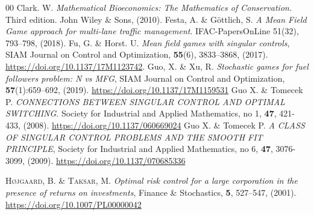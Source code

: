 \documentclass{article}
\begin{document}
\begin{thebibliography}{00}
Clark. W. \textit{Mathematical Bioeconomics: The Mathematics of Conservation.}
Third edition. John Wiley \& Sons, (2010).
Festa, A. \& G\"ottlich, S.
\textit{A Mean Field Game approach for multi-lane traffic management}.
IFAC-PapersOnLine 51(32), 793--798, (2018).
Fu, G. \&  Horst. U. \textit{Mean field games with singular controls}, SIAM
Journal on Control and Optimization, \textbf{55}(6), 3833–3868, (2017).
\url{https://doi.org/10.1137/17M1123742}.
Guo, X. \& Xu, R. \textit{Stochastic games for fuel followers problem: N vs
MFG}, SIAM Journal on Control and Optimization, \textbf{57}(1):659–692, (2019).
\url{https://doi.org/10.1137/17M1159531}
Guo X. \& Tomecek P. \textit{CONNECTIONS BETWEEN SINGULAR CONTROL AND
OPTIMAL SWITCHING}. Society for Industrial and Applied Mathematics, no 1, \textbf{47}, 421-433, (2008). \url{https://doi.org/10.1137/060669024}
Guo X. \& Tomecek P. \textit{A CLASS OF SINGULAR CONTROL PROBLEMS AND THE SMOOTH FIT PRINCIPLE}, Society for Industrial and Applied Mathematics, no 6, \textbf{47}, 3076-3099, (2009). \url{https://doi.org/10.1137/070685336}

\textsc{H\o jgaard, B.} \& \textsc{Taksar, M.} \textit{Optimal risk control for a large corporation in the presence
of returns on investments}, Finance \& Stochastics, \textbf{5}, 527–547, (2001).
\url{https://doi.org/10.1007/PL00000042}


\end{thebibliography}
\end{document}
